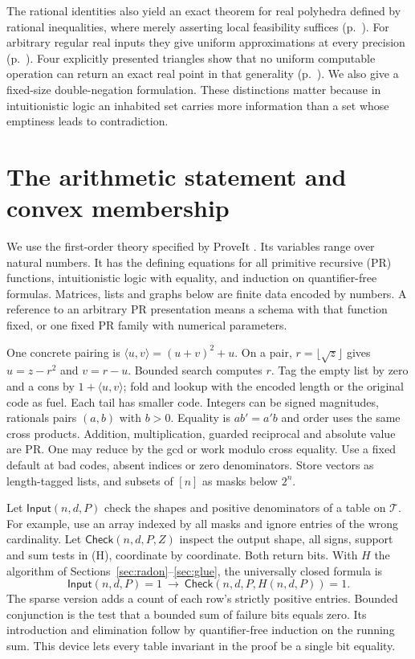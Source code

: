 \documentclass[11pt,letterpaper]{article}
\newcommand{\key}[1]{\smallskip\noindent{\sffamily\bfseries\color{ink}#1}\enspace}
\theoremstyle{packet}\newtheorem{theorem}{Theorem}\newtheorem{lem}[theorem]{Lemma}
\newcommand{\head}[1]{\section{#1}}
\begin{document}
The rational identities also yield an exact theorem for real polyhedra defined by rational inequalities, where merely asserting local feasibility suffices (p.~\pageref{sec:poly}). For arbitrary regular real inputs they give uniform approximations at every precision (p.~\pageref{sec:real}). Four explicitly presented triangles show that no uniform computable operation can return an exact real point in that generality (p.~\pageref{sec:obstruction}). We also give a fixed-size double-negation formulation. These distinctions matter because in intuitionistic logic an inhabited set carries more information than a set whose emptiness leads to contradiction.

\newpage
\head{The arithmetic statement and convex membership}\label{sec:codes}

We use the first-order theory specified by ProveIt \cite{proveit}. Its variables range over natural numbers. It has the defining equations for all primitive recursive (PR) functions, intuitionistic logic with equality, and induction on quantifier-free formulas. Matrices, lists and graphs below are finite data encoded by numbers. A reference to an arbitrary PR presentation means a schema with that function fixed, or one fixed PR family with numerical parameters.

\key{Codes.} One concrete pairing is $\langle u,v\rangle=(u+v)^2+u$. On a pair, $r=\lfloor\sqrt z\rfloor$ gives $u=z-r^2$ and $v=r-u$. Bounded search computes $r$. Tag the empty list by zero and a cons by $1+\langle u,v\rangle$; fold and lookup with the encoded length or the original code as fuel. Each tail has smaller code. Integers can be signed magnitudes, rationals pairs $(a,b)$ with $b>0$. Equality is $ab'=a'b$ and order uses the same cross products. Addition, multiplication, guarded reciprocal and absolute value are PR. One may reduce by the gcd or work modulo cross equality. Use a fixed default at bad codes, absent indices or zero denominators. Store vectors as length-tagged lists, and subsets of $[n]$ as masks below $2^n$.

\key{A single object-language formula.} Let $\mathsf{Input}(n,d,P)$ check the shapes and positive denominators of a table on $\mathcal T$. For example, use an array indexed by all masks and ignore entries of the wrong cardinality. Let $\mathsf{Check}(n,d,P,Z)$ inspect the output shape, all signs, support and sum tests in (H), coordinate by coordinate. Both return bits. With $H$ the algorithm of Sections~\ref{sec:radon}--\ref{sec:glue}, the universally closed formula is
\[
 \mathsf{Input}(n,d,P)=1\ \longrightarrow\
 \mathsf{Check}(n,d,P,H(n,d,P))=1 .
\]
The sparse version adds a count of each row's strictly positive entries. Bounded conjunction is the test that a bounded sum of failure bits equals zero. Its introduction and elimination follow by quantifier-free induction on the running sum. This device lets every table invariant in the proof be a single bit equality.
\end{document}
